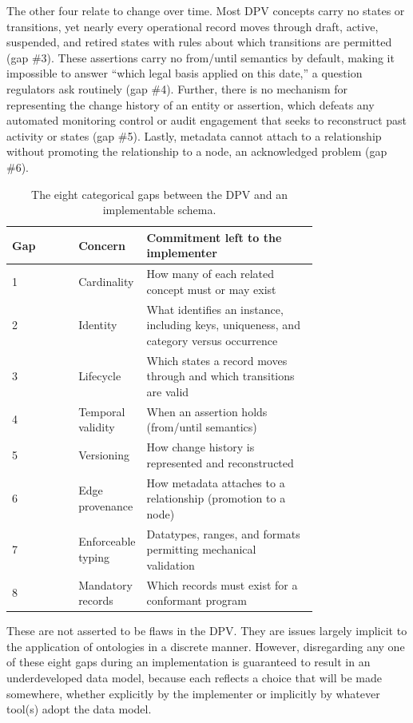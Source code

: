 \documentclass[10pt,letterpaper,twocolumn,twoside]{rho-class/rho}
\begin{document}
The other four relate to change over time. Most DPV concepts carry no states or transitions, yet nearly every operational record moves through draft, active, suspended, and retired states with rules about which transitions are permitted (gap \#3). These assertions carry no from/until semantics by default, making it impossible to answer ``which legal basis applied on this date,'' a question regulators ask routinely (gap \#4). Further, there is no mechanism for representing the change history of an entity or assertion, which defeats any automated monitoring control or audit engagement that seeks to reconstruct past activity or states (gap \#5). Lastly, metadata cannot attach to a relationship without promoting the relationship to a node, an acknowledged problem (gap \#6).

\begin{table}[ht]
\centering
\caption{The eight categorical gaps between the DPV and an implementable schema.}
\label{tab:gaps1}
\footnotesize
\begin{tabular}{@{}l p{0.2\linewidth} p{0.56\linewidth}@{}}
\hline
Gap & Concern & Commitment left to the implementer \\
\hline
1 & Cardinality & How many of each related concept must or may exist \\
2 & Identity & What identifies an instance, including keys, uniqueness, and category versus occurrence \\
3 & Lifecycle & Which states a record moves through and which transitions are valid \\
4 & Temporal validity & When an assertion holds (from/until semantics) \\
5 & Versioning & How change history is represented and reconstructed \\
6 & Edge provenance & How metadata attaches to a relationship (promotion to a node) \\
7 & Enforceable typing & Datatypes, ranges, and formats permitting mechanical validation \\
8 & Mandatory records & Which records must exist for a conformant program \\
\hline
\end{tabular}
\end{table}

These are not asserted to be flaws in the DPV. They are issues largely implicit to the application of ontologies in a discrete manner. However, disregarding any one of these eight gaps during an implementation is guaranteed to result in an underdeveloped data model, because each reflects a choice that will be made somewhere, whether explicitly by the implementer or implicitly by whatever tool(s) adopt the data model.
\end{document}
